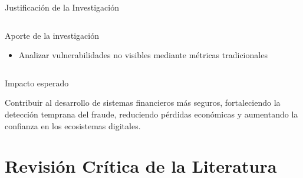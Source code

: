 \documentclass[aspectratio=169, 8pt]{beamer}
\begin{document}
\begin{frame}{Justificación de la Investigación}
\begin{columns}
\begin{exampleblock}{Aporte de la investigación}
\begin{itemize}
\item Analizar vulnerabilidades no visibles
mediante métricas tradicionales

\end{itemize}

\end{exampleblock}

\end{columns}

\vspace{0.25cm}

\begin{alertblock}{Impacto esperado}

Contribuir al desarrollo de sistemas financieros
más seguros, fortaleciendo la detección temprana
del fraude, reduciendo pérdidas económicas y
aumentando la confianza en los ecosistemas digitales.

\end{alertblock}

\end{frame}

\begin{frame}
\vfill
\centering
{\fontsize{28}{28}\selectfont\bfseries
{}}
\vfill
\end{frame}
\section{Revisión Crítica de la Literatura}
\end{document}
